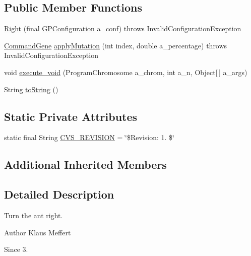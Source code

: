 \subsection*{Public Member Functions}
\begin{DoxyCompactItemize}
\item 
\hyperlink{classexamples_1_1gp_1_1anttrail_1_1_right_a2702ca68c53f0c2bac207028a1c5cd9d}{Right} (final \hyperlink{classorg_1_1jgap_1_1gp_1_1impl_1_1_g_p_configuration}{G\-P\-Configuration} a\-\_\-conf)  throws Invalid\-Configuration\-Exception 
\item 
\hyperlink{classorg_1_1jgap_1_1gp_1_1_command_gene}{Command\-Gene} \hyperlink{classexamples_1_1gp_1_1anttrail_1_1_right_acc84151ef8fd34ed455ee81c4ff6ee72}{apply\-Mutation} (int index, double a\-\_\-percentage)  throws Invalid\-Configuration\-Exception 
\item 
void \hyperlink{classexamples_1_1gp_1_1anttrail_1_1_right_a19cc416f0e12a5940f54840e40b4381a}{execute\-\_\-void} (Program\-Chromosome a\-\_\-chrom, int a\-\_\-n, Object\mbox{[}$\,$\mbox{]} a\-\_\-args)
\item 
String \hyperlink{classexamples_1_1gp_1_1anttrail_1_1_right_a739131babe72edf49ca91d069adfcdf7}{to\-String} ()
\end{DoxyCompactItemize}
\subsection*{Static Private Attributes}
\begin{DoxyCompactItemize}
\item 
static final String \hyperlink{classexamples_1_1gp_1_1anttrail_1_1_right_ac72fb11d200e28efed8f22acd8a23dc0}{C\-V\-S\-\_\-\-R\-E\-V\-I\-S\-I\-O\-N} = \char`\"{}\$Revision\-: 1. \$\char`\"{}
\end{DoxyCompactItemize}
\subsection*{Additional Inherited Members}


\subsection{Detailed Description}
Turn the ant right.

\begin{DoxyAuthor}{Author}
Klaus Meffert 
\end{DoxyAuthor}
\begin{DoxySince}{Since}
3. 
\end{DoxySince}


